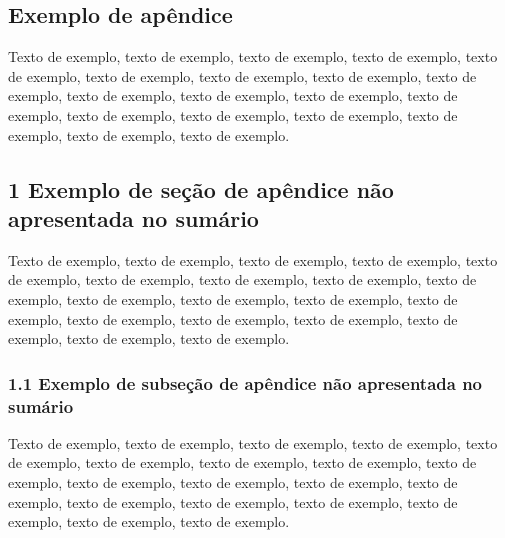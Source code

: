 \documentclass[
	12pt,				%
	oneside,			%
	a4paper,			%
	english,			%
	brazil				%
	]{abntex2ppgsi}
\begin{document}
\begin{apendicesenv}


%
%
%
\chapter{Exemplo de apêndice}

Texto de exemplo, texto de exemplo, texto de exemplo, texto de exemplo, texto de exemplo, texto de exemplo, texto de exemplo, texto de exemplo, texto de exemplo, texto de exemplo, texto de exemplo, texto de exemplo, texto de exemplo, texto de exemplo, texto de exemplo, texto de exemplo, texto de exemplo, texto de exemplo, texto de exemplo.

\section*{1 Exemplo de seção de apêndice não apresentada no sumário}

Texto de exemplo, texto de exemplo, texto de exemplo, texto de exemplo, texto de exemplo, texto de exemplo, texto de exemplo, texto de exemplo, texto de exemplo, texto de exemplo, texto de exemplo, texto de exemplo, texto de exemplo, texto de exemplo, texto de exemplo, texto de exemplo, texto de exemplo, texto de exemplo, texto de exemplo.

\subsection*{1.1 Exemplo de subseção de apêndice não apresentada no sumário}

Texto de exemplo, texto de exemplo, texto de exemplo, texto de exemplo, texto de exemplo, texto de exemplo, texto de exemplo, texto de exemplo, texto de exemplo, texto de exemplo, texto de exemplo, texto de exemplo, texto de exemplo, texto de exemplo, texto de exemplo, texto de exemplo, texto de exemplo, texto de exemplo, texto de exemplo.


\end{apendicesenv}
\end{document}
